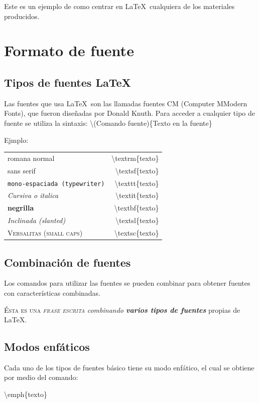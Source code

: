 \documentclass{article}
\begin{document}
\begin{center} 
Este es un ejemplo de como centrar en \LaTeX\ cualquiera de los materiales producidos. 
\end{center}


\section{Formato de fuente}

\subsection{Tipos de fuentes \LaTeX}
Las fuentes que usa \LaTeX\ son las llamadas fuentes CM (Computer MModern Fonts), que fueron
dise\~nadas por Donald Knuth. Para acceder a cualquier tipo de fuente se utiliza la sintaxis: 
\textbackslash (Comando fuente)\{Texto en la fuente\}

Ejmplo:

\begin{tabular}{l  r}

\textrm{romana normal} & \textbackslash textrm\{texto\}\\
\textsf{sans serif} & \textbackslash textsf\{texto\}\\
\texttt{mono-espaciada (typewriter)} & \textbackslash texttt\{texto\}\\
\textit{Cursiva o italica} & \textbackslash textit\{texto\}\\
\textbf{negrilla} & \textbackslash textbf\{texto\}\\
\textsl{Inclinada (slanted)} & \textbackslash textsl\{texto\}\\
\textsc{Versalitas (small caps)} & \textbackslash textsc\{texto\}\\
\end{tabular}


\subsection{Combinaci\'on de fuentes}
Los comandos para utilizar las fuentes se pueden combinar para obtener fuentes con caracter\'isticas combinadas.

\textsc{\'Esta es una \textit{frase escrita}} \textsl{combinando \textbf{varios \textsf{tipos de 
fuentes}}} propias \textrm{de} \LaTeX.


\subsection{Modos enf\'aticos} 
Cada uno de los tipos de fuentes b\'asico tiene su modo enf\'atico, el cual se obtiene por medio 
del comando: \\
\centerline{\textbackslash emph\{texto\}} 
\end{document}
